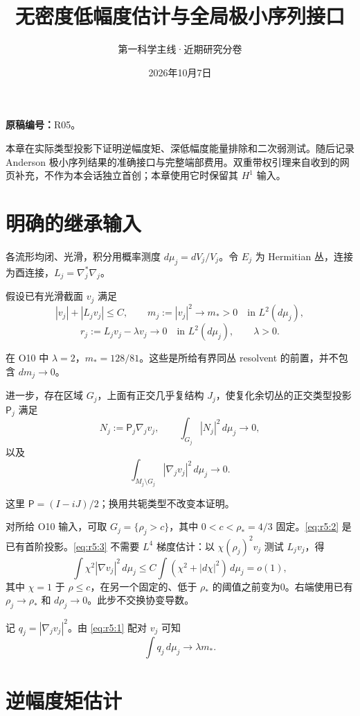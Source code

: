 \documentclass[UTF8,11pt,fontset=none]{ctexart}
\title{无密度低幅度估计与全局极小序列接口}
\author{第一科学主线·近期研究分卷}
\date{2026年10月7日}
\begin{document}
\maketitle
\noindent\textbf{原稿编号：}R05。

本章在实际类型投影下证明逆幅度矩、深低幅度能量排除和二次弱测试。随后记录 Anderson 极小序列结果的准确接口与完整端部费用。双重带权引理来自收到的网页补充，不作为本会话独立首创；本章使用它时保留其 \(H^1\) 输入。\cite{R05,Weighted,Anderson}

\section{明确的继承输入}\label{ch5:ux660eux786eux7684ux7ee7ux627fux8f93ux5165}

各流形均闭、光滑，积分用概率测度 \(d\mu_j=dV_j/V_j\)。令 \(E_j\) 为 Hermitian 丛，连接为酉连接，\(L_j=\nabla_j^*\nabla_j\)。

假设已有光滑截面 \(v_j\) 满足 \[
 |v_j|+|L_jv_j|\le C,\qquad
 m_j:=|v_j|^2\longrightarrow m_*>0\quad\text{in }L^2(d\mu_j),
\] \[
 r_j:=L_jv_j-\lambda v_j\longrightarrow0\quad\text{in }L^2(d\mu_j),\qquad \lambda>0.
\tag{5.1}\label{eq:r5:1}
\]

在 O10 中 \(\lambda=2\)，\(m_*=128/81\)。这些是所给有界同丛 resolvent 的前置，并不包含 \(dm_j\to0\)。

进一步，存在区域 \(G_j\)，上面有正交几乎复结构 \(J_j\)，使复化余切丛的正交类型投影 \(\mathsf P_j\) 满足 \[
 N_j:=\mathsf P_j\nabla_jv_j,\qquad
 \int_{G_j}|N_j|^2\,d\mu_j\longrightarrow0,
\tag{5.2}\label{eq:r5:2}
\] 以及 \[
 \int_{M_j\setminus G_j}|\nabla_jv_j|^2\,d\mu_j\longrightarrow0.
\tag{5.3}\label{eq:r5:3}
\]

这里 \(\mathsf P=(I-iJ)/2\)；换用共轭类型不改变本证明。

对所给 O10 输入，可取 \(G_j=\{\rho_j>c\}\)，其中 \(0<c<\rho_*=4/3\) 固定。\eqref{eq:r5:2} 是已有首阶投影。\eqref{eq:r5:3} 不需要 \(L^4\) 梯度估计：以 \(\chi(\rho_j)^2v_j\) 测试 \(L_jv_j\)，得 \[
 \int\chi^2|\nabla v_j|^2\,d\mu_j
 \le C\int(\chi^2+|d\chi|^2)\,d\mu_j=o(1),
\] 其中 \(\chi=1\) 于 \(\rho\le c\)，在另一个固定的、低于 \(\rho_*\) 的阈值之前变为0。右端使用已有 \(\rho_j\to\rho_*\) 和 \(d\rho_j\to0\)。此步不交换协变导数。

记 \(q_j=|\nabla_jv_j|^2\)。由 \eqref{eq:r5:1} 配对 \(v_j\) 可知 \[
 \int q_j\,d\mu_j\longrightarrow\lambda m_*.
\tag{5.4}\label{eq:r5:4}
\]

\section{逆幅度矩估计}\label{ch5:ux9006ux5e45ux5ea6ux77e9ux4f30ux8ba1}
\end{document}
